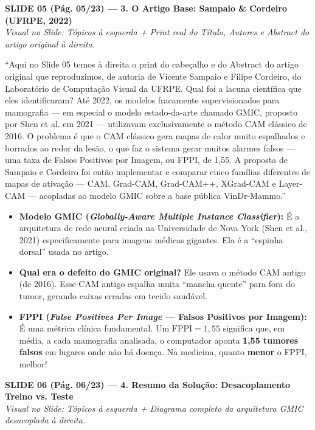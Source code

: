 \documentclass[11pt,a4paper]{article}
\newcommand{\slideheader}[3]{%
    \vspace{10pt}%
    \begin{tcolorbox}[colback=slateborder, colframe=slateborder, coltext=white, boxrule=0pt, arc=3pt, left=8pt, right=8pt, top=5pt, bottom=5pt]
        {\large\bfseries #1 — #2}\\[2pt]
        {\small\itshape Visual no Slide: #3}
    \end{tcolorbox}%
}
\newenvironment{falabox}{%
    \begin{tcolorbox}[colback=speechbg, colframe=speechborder, boxrule=1.2pt, arc=4pt, left=10pt, right=10pt, top=8pt, bottom=8pt, title={\bfseries O QUE VOCÊ DEVE FALAR (Fala Sugerida)}]%
}{%
    \end{tcolorbox}%
}
\newenvironment{explicabox}{%
    \begin{tcolorbox}[colback=explainbg, colframe=explainborder, boxrule=0.8pt, arc=4pt, left=10pt, right=10pt, top=8pt, bottom=8pt, title={\bfseries ENTENDA O QUE VOCÊ ESTÁ FALANDO (Explicação Didática de Cada Termo)}]%
}{%
    \end{tcolorbox}%
}
\begin{document}
\newpage
\slideheader{SLIDE 05 (Pág. 05/23)}{3. O Artigo Base: Sampaio \& Cordeiro (UFRPE, 2022)}{Tópicos à esquerda + Print real do Título, Autores e Abstract do artigo original à direita.}

\begin{falabox}
``Aqui no Slide 05 temos à direita o print do cabeçalho e do Abstract do artigo original que reproduzimos, de autoria de Vicente Sampaio e Filipe Cordeiro, do Laboratório de Computação Visual da UFRPE. Qual foi a lacuna científica que eles identificaram? Até 2022, os modelos fracamente supervisionados para mamografia — em especial o modelo estado-da-arte chamado GMIC, proposto por Shen et al. em 2021 — utilizavam exclusivamente o método CAM clássico de 2016. O problema é que o CAM clássico gera mapas de calor muito espalhados e borrados ao redor da lesão, o que faz o sistema gerar muitos alarmes falsos — uma taxa de Falsos Positivos por Imagem, ou FPPI, de 1,55. A proposta de Sampaio e Cordeiro foi então implementar e comparar cinco famílias diferentes de mapas de ativação — CAM, Grad-CAM, Grad-CAM++, XGrad-CAM e Layer-CAM — acopladas ao modelo GMIC sobre a base pública VinDr-Mammo.''
\end{falabox}

\begin{explicabox}
\begin{itemize}[leftmargin=*, itemsep=4pt]
    \item \textbf{Modelo GMIC (\textit{Globally-Aware Multiple Instance Classifier}):} É a arquitetura de rede neural criada na Universidade de Nova York (Shen et al., 2021) especificamente para imagens médicas gigantes. Ela é a ``espinha dorsal'' usada no artigo.
    \item \textbf{Qual era o defeito do GMIC original?} Ele usava o método CAM antigo (de 2016). Esse CAM antigo espalha muita ``mancha quente'' para fora do tumor, gerando caixas erradas em tecido saudável.
    \item \textbf{FPPI (\textit{False Positives Per Image} — Falsos Positivos por Imagem):} É uma métrica clínica fundamental. Um $\text{FPPI} = 1{,}55$ significa que, em média, a cada mamografia analisada, o computador aponta \textbf{1,55 tumores falsos} em lugares onde não há doença. Na medicina, quanto \textbf{menor} o FPPI, melhor!
\end{itemize}
\end{explicabox}

\newpage
\slideheader{SLIDE 06 (Pág. 06/23)}{4. Resumo da Solução: Desacoplamento Treino vs. Teste}{Tópicos à esquerda + Diagrama completo da arquitetura GMIC desacoplada à direita.}
\end{document}
